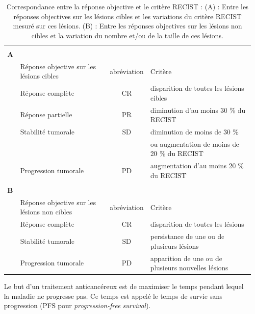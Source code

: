 \begin{table}[!ht]
  \centering
  \caption[Correspondance entre la réponse objective et le critère RECIST]{Correspondance entre la réponse objective et le critère RECIST : (A) : Entre les réponses objectives sur les lésions cibles et les variations du critère RECIST mesuré sur ces lésions. (B) : Entre les réponses objectives sur les lésions non cibles et la variation du nombre 
et/ou de la taille de ces lésions.}
    \begin{tabular}{l p{4cm} c p{5cm}}
       &  &  &  \\
             \textbf{A} & \textbf{} & \textbf{} & \textbf{} \\
      \hline
      \hline
       & Réponse objective sur les lésions cibles & abréviation & Critère \\
       & Réponse complète & CR & disparition de toutes les lésions cibles \\
       & Réponse partielle & PR & diminution d'au moins 30 \% du RECIST \\
       & Stabilité tumorale & SD & diminution de moins de 30 \% \\
       &  &  & ou augmentation de moins de 20 \% du RECIST \\
       & Progression tumorale & PD & augmentation d'au moins 20 \% du RECIST \\
      \hline
       &  &  &  \\
     \textbf{B} &  &  &  \\
       \hline
       \hline
      & Réponse objective sur les lésions non cibles & abréviation & Critère \\
       & Réponse complète & CR & disparition de toutes les lésions \\
       & Stabilité tumorale & SD & persistance de une ou de plusieurs lésions \\
       & Progression tumorale & PD & apparition de une ou de plusieurs nouvelles lésions \\
      \hline
    \end{tabular}
  \label{tab:1}
\end{table}
Le but d'un traitement anticancéreux est de maximiser le temps pendant lequel la maladie ne progresse pas. Ce temps est appelé le temps de survie sans progression (PFS pour \textit{progression-free survival}).

